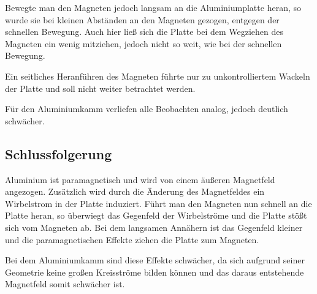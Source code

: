 \documentclass[11pt,a4paper,titlepage, ngerman]{article}
\begin{document}
			Bewegte man den Magneten jedoch langsam an die Aluminiumplatte heran, so wurde sie bei kleinen Abständen an den Magneten gezogen, entgegen der schnellen Bewegung. 
			Auch hier ließ sich die Platte bei dem Wegziehen des Magneten ein wenig mitziehen, jedoch nicht so weit, wie bei der schnellen Bewegung.
			
			Ein seitliches Heranführen des Magneten führte nur zu unkontrolliertem Wackeln der Platte und soll nicht weiter betrachtet werden.
			
			Für den Aluminiumkamm verliefen alle Beobachten analog, jedoch deutlich schwächer.
			
		\subsection*{Schlussfolgerung}	
			
			Aluminium ist paramagnetisch und wird von einem äußeren Magnetfeld angezogen.
			Zusätzlich wird durch die Änderung des Magnetfeldes ein Wirbelstrom in der Platte induziert.
			Führt man den Magneten nun schnell an die Platte heran, so überwiegt das Gegenfeld der Wirbelströme und die Platte stößt sich vom Magneten ab.
			Bei dem langsamen Annähern ist das Gegenfeld kleiner und die paramagnetischen Effekte ziehen die Platte zum Magneten.
			
			Bei dem Aluminiumkamm sind diese Effekte schwächer, da sich aufgrund seiner Geometrie keine großen Kreisströme bilden können und das daraus entstehende Magnetfeld somit schwächer ist.
		
\end{document}
